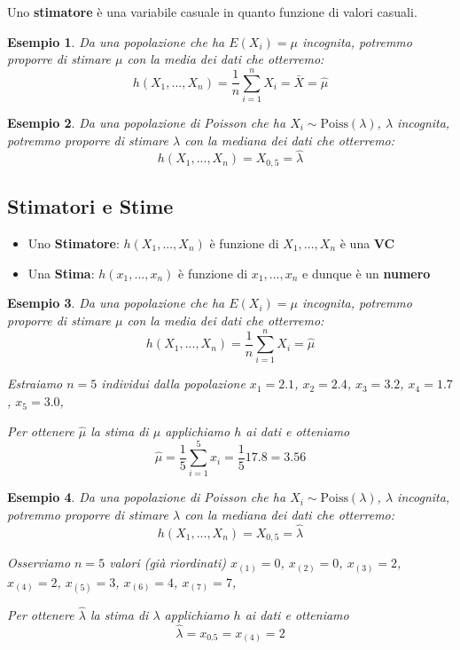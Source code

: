 \documentclass[
  11pt,
]{book}
\providecommand{\tightlist}{%
  \setlength{\itemsep}{0pt}\setlength{\parskip}{0pt}}
\theoremstyle{mytheoremstyle}
\theoremstyle{mydefstyle}
\newtheorem{example}{{Esempio}}[section]
\newenvironment{nota}
  {
\begin{tcolorbox}[enhanced,breakable,arc=0.1mm,boxrule=1pt,colback=white,colframe=iblue,title=\bf \fontfamily{lmss}\selectfont \faInfoCircle \hspace{.5 cm} Nota,drop fuzzy shadow]
}{
\end{tcolorbox}
  }
\begin{document}
Uno \textbf{stimatore} è una variabile casuale in quanto funzione di valori casuali.

\begin{example}
Da una popolazione che ha \(E(X_i)=\mu\) incognita, potremmo proporre di \emph{stimare} \(\mu\) con la media dei dati che \emph{otterremo}:
\[h(X_1,...,X_n)=\frac 1 n \sum_{i=1}^n X_i=\bar X=\hat \mu\]
\end{example}

\begin{example}
Da una popolazione di Poisson che ha \(X_i\sim\text{Poiss}(\lambda)\), \(\lambda\) incognita, potremmo proporre di \emph{stimare} \(\lambda\) con la mediana dei dati che \emph{otterremo}:
\[h(X_1,...,X_n)=X_{0,5}=\hat\lambda\]
\end{example}

\subsection{Stimatori e Stime}\label{stimatori-e-stime}

\begin{nota}

\begin{itemize}
\tightlist
\item
  Uno \textbf{Stimatore}: \(h(X_1,...,X_n)\) è funzione di \(X_1,...,X_n\) è una \textbf{VC}
\item
  Una \textbf{Stima}: \(h(x_1,...,x_n)\) è funzione di \(x_1,...,x_n\) e dunque è un \textbf{numero}
\end{itemize}

\end{nota}

\begin{example}
Da una popolazione che ha \(E(X_i)=\mu\) incognita, potremmo proporre di \emph{stimare} \(\mu\) con la media dei dati che \emph{otterremo}:
\[h(X_1,...,X_n)=\frac 1 n \sum_{i=1}^n X_i=\hat \mu\]

Estraiamo \(n=5\) individui dalla popolazione \(x_1=2.1\), \(x_2=2.4\), \(x_3=3.2\), \(x_4=1.7\), \(x_5=3.0\),

Per ottenere \(\hat\mu\) la stima di \(\mu\) applichiamo \(h\) ai dati e otteniamo
\[\hat\mu = \frac 1 5\sum_{i=1}^5x_i=\frac 1 5 17.8=3.56\]
\end{example}

\begin{example}
Da una popolazione di Poisson che ha \(X_i\sim\text{Poiss}(\lambda)\), \(\lambda\) incognita, potremmo proporre di \emph{stimare} \(\lambda\) con la mediana dei dati che \emph{otterremo}:
\[h(X_1,...,X_n)=X_{0,5}=\hat\lambda\]

Osserviamo \(n=5\) valori (già riordinati)
\(x_{(1)}=0\), \(x_{(2)}=0\), \(x_{(3)}=2\), \(x_{(4)}=2\), \(x_{(5)}=3\), \(x_{(6)}=4\), \(x_{(7)}=7\),

Per ottenere \(\hat\lambda\) la stima di \(\lambda\) applichiamo \(h\) ai dati e otteniamo
\[\hat\lambda = x_{0.5}=x_{(4)}=2\]
\end{example}
\end{document}
